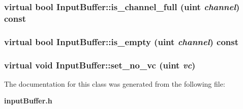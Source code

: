 \subsubsection[{is\_\-channel\_\-full}]{\setlength{\rightskip}{0pt plus 5cm}virtual bool InputBuffer::is\_\-channel\_\-full ({\bf uint} {\em channel}) const\hspace{0.3cm}{\tt  [virtual]}}\label{classInputBuffer_53d9799602c95d0b17b73e4b1d1b73d6}


\subsubsection[{is\_\-empty}]{\setlength{\rightskip}{0pt plus 5cm}virtual bool InputBuffer::is\_\-empty ({\bf uint} {\em channel}) const\hspace{0.3cm}{\tt  [virtual]}}\label{classInputBuffer_bc130ab26e953ef77b7faa804388cb90}


\subsubsection[{set\_\-no\_\-vc}]{\setlength{\rightskip}{0pt plus 5cm}virtual void InputBuffer::set\_\-no\_\-vc ({\bf uint} {\em vc})\hspace{0.3cm}{\tt  [virtual]}}\label{classInputBuffer_27ff9889e0ec93036b06b161f948bc8f}




The documentation for this class was generated from the following file:\begin{CompactItemize}
\item 
{\bf inputBuffer.h}\end{CompactItemize}
